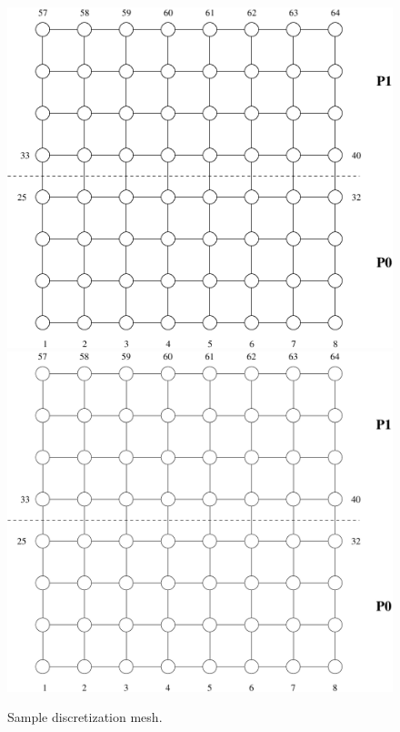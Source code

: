 \begin{figure}[h] 
\begin{center}
\ifcase\pdfoutput
\includegraphics[scale=0.45]{figures/try8x8.png}
\or
\includegraphics[scale=0.45]{figures/try8x8}
\fi
\end{center}
\caption{Sample discretization mesh.\label{fig:try8x8}}
\end{figure}

